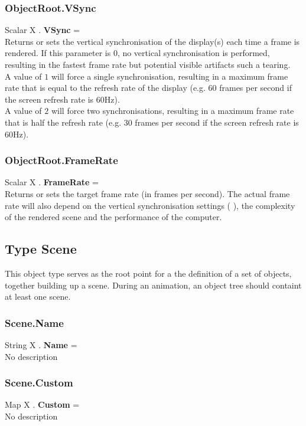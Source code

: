 \subsubsection{ObjectRoot.VSync \label{F:ObjectRoot:VSync}}
Scalar X . \textbf{VSync} = \\
Returns or sets the vertical synchronisation of the display(s) each time a frame is rendered.
If this parameter is $0$, no vertical synchronisation is performed, resulting in the fastest frame rate but potential visible artifacts such a tearing. \\
A value of $1$ will force a single synchronisation, resulting in a maximum frame rate that is equal to the refresh rate of the display (e.g. 60 frames per second if the screen refresh rate is 60Hz). \\
A value of $2$ will force two synchronisations, resulting in a maximum frame rate that is half the refresh rate (e.g. 30 frames per second if the screen refresh rate is 60Hz).

\subsubsection{ObjectRoot.FrameRate \label{F:ObjectRoot:FrameRate}}
Scalar X . \textbf{FrameRate} = \\
Returns or sets the target frame rate (in frames per second). The actual frame rate will also depend on the vertical synchronisation settings (  ), the complexity of the rendered scene and the performance of the computer.

\subsection{Type Scene \label{T:Scene}}
This object type serves as the root point for a the definition of a set of objects, together building up a scene. During an animation, an object tree should containt at least one scene.

\subsubsection{Scene.Name \label{F:Scene:Name}}
String X . \textbf{Name} = \\
No description

\subsubsection{Scene.Custom \label{F:Scene:Custom}}
Map X . \textbf{Custom} = \\
No description

